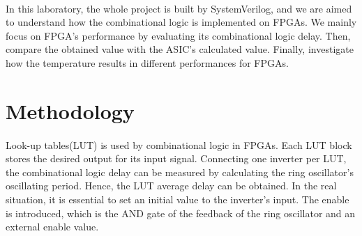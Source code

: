 \documentclass[12pt]{article}
\begin{document}
    \paragraph{}
    In this laboratory, the whole project is built by SystemVerilog, and we are aimed to understand how the combinational logic is implemented on FPGAs. We mainly focus on FPGA's performance by evaluating its combinational logic delay. Then, compare the obtained value with the ASIC's calculated value. Finally, investigate how the temperature results in different performances for FPGAs. 
    
    
    
    \section{Methodology}
    \paragraph{}
    Look-up tables(LUT) is used by combinational logic in FPGAs. Each LUT block stores the desired output for its input signal. Connecting one inverter per LUT, the combinational logic delay can be measured by calculating the ring oscillator's oscillating period. Hence, the LUT average delay can be obtained. In the real situation, it is essential to set an initial value to the inverter's input. The enable is introduced, which is the AND gate of the feedback of the ring oscillator and an external enable value.
    
\end{document}
